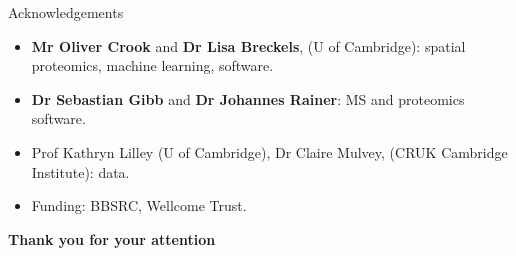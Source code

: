 \documentclass[presentation]{beamer}
\begin{document}
\begin{frame}
  \begin{block}{Acknowledgements}
    \begin{itemize}
    \item \textbf{Mr Oliver Crook} and \textbf{Dr Lisa Breckels}, (U
      of Cambridge): spatial proteomics, machine learning, software.
    \item \textbf{Dr Sebastian Gibb} and \textbf{Dr Johannes Rainer}:
      MS and proteomics software.
    \item Prof Kathryn Lilley (U of Cambridge), Dr Claire Mulvey,
      (CRUK Cambridge Institute): data.
    \item Funding: BBSRC, Wellcome Trust.
    \end{itemize}
  \end{block}

  
  \begin{center}
    \textbf{Thank you for your attention}
  \end{center}

\end{frame}
\end{document}
